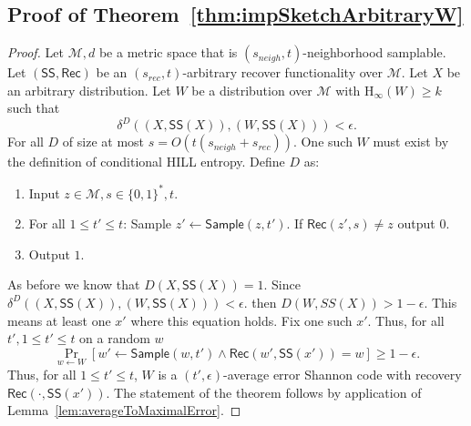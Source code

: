 \documentclass[11pt]{article}
\newcommand{\thref}[1]{\mbox{Theorem~\ref{#1}}}
\newcommand{\lemref}[1]{\mbox{Lemma~\ref{#1}}}
\newcommand{\class}[1]{{\ensuremath{\mathsf{#1}}}}
\newcommand{\sketch}{\ensuremath{\class{SS}}\xspace}
\newcommand{\rec}{\ensuremath{\class{Rec}}\xspace}
\newcommand{\sample}{\ensuremath{\class{Sample}}\xspace}
\newcommand{\hill}{\ensuremath{\mathtt{HILL}}\xspace}
\newcommand{\Hoo}{\mathrm{H}_\infty}
\begin{document}
\subsection{Proof of \thref{thm:impSketchArbitraryW}}
\label{sec:proof of thm sketch implies code}
\begin{proof}
Let $\mathcal{M},d$ be a metric space that is $(s_{neigh},t)$-neighborhood samplable.  Let $(\sketch, \rec)$ be an $(s_{rec}, t)$-arbitrary recover functionality over $\mathcal{M}$.  Let $X$ be an arbitrary distribution.  Let $W$ be a distribution over $\mathcal{M}$ with $\Hoo(W)\geq k$ such that 
\[
\delta^D((X, \sketch(X)), (W, \sketch(X)))<\epsilon.
\]  
For all $D$ of size at most $s = O(t(s_{neigh}+s_{rec}))$.  One such $W$ must exist by the definition of conditional HILL entropy.
Define $D$ as:
\begin{enumerate}
\item Input $z\in\mathcal{M}, s \in\{0, 1\}^*, t$.
\item For all $1\leq t'\leq t$: 
\subitem Sample $z'\leftarrow \sample(z, t')$.
\subitem If $\rec(z', s) \neq  z$ output $0$.
\item Output $1$.
\end{enumerate}
  As before we know that $D(X, \sketch(X)) = 1$.  Since 
$\delta^D((X, \sketch(X)), (W, \sketch(X)))<\epsilon.$ then $D(W, SS(X))>1-\epsilon$.  This means at least one $x'$ where this equation holds.  Fix one such $x'$.  
Thus, for all $t', 1\leq t'\leq t$ on a random $w$
\[ \Pr_{w\leftarrow W}[w'\leftarrow \sample(w, t') \wedge \rec(w', \sketch(x')) = w]\geq 1-\epsilon.\]  
Thus, for all $1\leq t'\leq t$, $W$ is a $(t', \epsilon)$-average error Shannon code with recovery $\rec(\cdot, \sketch(x'))$.  The statement of the theorem follows by application of \lemref{lem:averageToMaximalError}.  
\end{proof}
\end{document}
